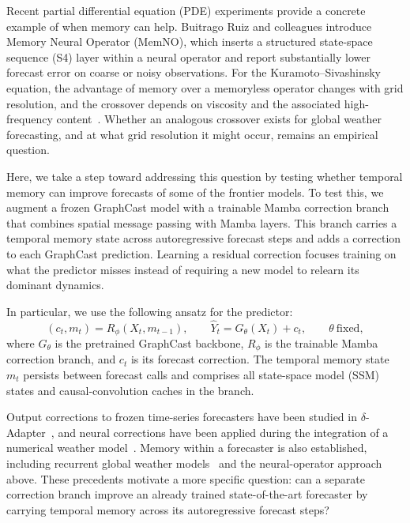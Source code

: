 \documentclass{article}
\newcommand{\suozhi}[1]{\textcolor{blue}{[suozhi: #1]}}
\renewcommand{\suozhi}[1]{}
\begin{document}
\suozhi{Please define what it means to capture non-Markovian effects and use that definition consistently in the introduction and memory experiments. The evidence supports useful history dependence beyond the baseline's two-frame input. It does not identify a specific physical memory kernel.}

Recent partial differential equation (PDE) experiments provide a concrete example of when memory can help. Buitrago Ruiz and colleagues introduce Memory Neural Operator (MemNO), which inserts a structured state-space sequence (S4) layer within a neural operator and report substantially lower forecast error on coarse or noisy observations. For the Kuramoto--Sivashinsky equation, the advantage of memory over a memoryless operator changes with grid resolution, and the crossover depends on viscosity and the associated high-frequency content~\citep{buitrago2025memory}. Whether an analogous crossover exists for global weather forecasting, and at what grid resolution it might occur, remains an empirical question.

Here, we take a step toward addressing this question by testing whether temporal memory can improve forecasts of some of the frontier models. To test this, we augment a frozen GraphCast model with a trainable Mamba correction branch that combines spatial message passing with Mamba layers. This branch carries a temporal memory state across autoregressive forecast steps and adds a correction to each GraphCast prediction. Learning a residual correction focuses training on what the predictor misses instead of requiring a new model to relearn its dominant dynamics.

In particular, we use the following ansatz for the predictor:
\begin{equation}
    (c_t,m_t)=R_\phi(X_t,m_{t-1}),
    \qquad
    \widehat{Y}_t=G_\theta(X_t)+c_t,
    \qquad \theta\ \text{fixed},
    \label{eq:intro_memory_correction}
\end{equation}
where $G_\theta$ is the pretrained GraphCast backbone, $R_\phi$ is the trainable Mamba correction branch, and $c_t$ is its forecast correction. The temporal memory state $m_t$ persists between forecast calls and comprises all state-space model (SSM) states and causal-convolution caches in the branch. 

Output corrections to frozen time-series forecasters have been studied in $\delta$-Adapter~\citep{liang2026forecast}, and neural corrections have been applied during the integration of a numerical weather model~\citep{chen2022correcting}. Memory within a forecaster is also established, including recurrent global weather models~\citep{hu2023swinvrnn} and the neural-operator approach above. These precedents motivate a more specific question: can a separate correction branch improve an already trained state-of-the-art forecaster by carrying temporal memory across its autoregressive forecast steps?
\end{document}
